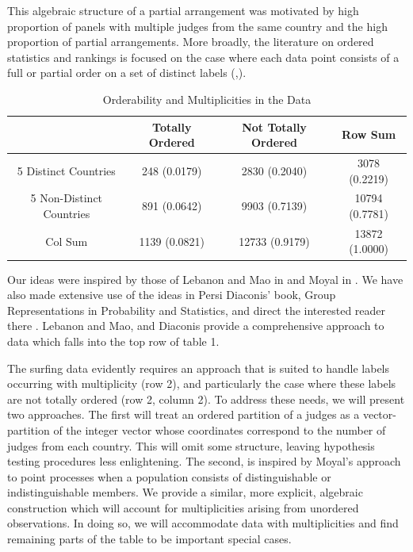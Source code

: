 \documentclass{article}
\begin{document}
This algebraic structure of a partial arrangement was motivated by high proportion of panels with multiple judges from the same country and the high proportion of partial arrangements. More broadly, the literature on ordered statistics and rankings is focused on the case where each data point consists of a full or partial order on a set of distinct labels (\cite{LebMao08},\cite{FliVer93}).

\begin{table}
\caption{Orderability and Multiplicities in the Data }
\label{OrderAndMultOfData}
\begin{center} \begin{tabular}{|c|c|c|c|}
\hline
 & Totally Ordered & Not Totally Ordered & Row Sum  \\ 
\hline
5 Distinct Countries & 248 (0.0179)  & 2830 (0.2040) & 3078 (0.2219)  \\
5 Non-Distinct Countries & 891 (0.0642)  & 9903 (0.7139) & 10794 (0.7781) \\
\hline
Col Sum  & 1139 (0.0821) & 12733 (0.9179)&  13872 (1.0000)\\
\hline
\end{tabular} \end{center}
\end{table}

Our ideas were inspired by those of Lebanon and Mao in \cite{LebMao08} and Moyal in \cite{Moyal62}. We have also made extensive use of the ideas in Persi Diaconis' book, Group Representations in Probability and Statistics, and direct the interested reader there \cite{Diaconis88}. Lebanon and Mao, and Diaconis provide a comprehensive approach to data which falls into the top row of table 1.

The surfing data evidently requires an approach that is suited to handle labels occurring with multiplicity (row 2), and particularly the case where these labels are not totally ordered (row 2, column 2). To address these needs, we will present two approaches. The first will treat an ordered partition of a judges as a vector-partition of the integer vector whose coordinates correspond to the number of judges from each country. This will omit some structure, leaving hypothesis testing procedures less enlightening. The second, is inspired by Moyal's approach to point processes when a population consists of distinguishable or indistinguishable members. We provide a similar, more explicit, algebraic construction which will account for multiplicities arising from unordered observations. In doing so, we will accommodate data with multiplicities and find remaining parts of the table to be important special cases.
\end{document}
